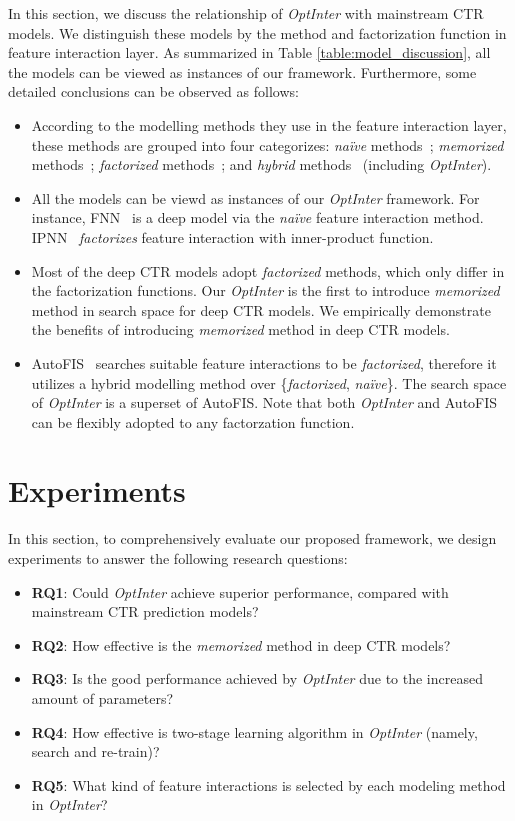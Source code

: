 \documentclass[conference]{IEEEtran}
\begin{document}
In this section, we discuss the relationship of \textit{OptInter} with mainstream CTR models. We distinguish these models by the method and factorization function in feature interaction layer. As summarized in Table \ref{table:model_discussion}, all the models can be viewed as instances of our framework. Furthermore, some detailed conclusions can be observed as follows:
\begin{itemize}
    \item According to the modelling methods they use in the feature interaction layer, these methods are grouped into four categorizes: \emph{naïve} methods~\cite{LR,FNN}; \emph{memorized} methods~\cite{Poly-2,Wide_Deep}; \emph{factorized} methods~\cite{FM,FwFM,FM2,PNN16,PNN19,DeepFM}; and \emph{hybrid} methods~\cite{AutoFis} (including \textit{OptInter}).
     \item All the models can be viewd as instances of our \textit{OptInter} framework. For instance, FNN~\cite{FNN} is a deep model via the \emph{naïve} feature interaction method. IPNN~\cite{PNN16} \emph{factorizes} feature interaction with inner-product function.
    \item Most of the deep CTR models adopt \emph{factorized} methods, which only differ in the factorization functions. Our \textit{OptInter} is the first to introduce \emph{memorized} method in search space for deep CTR models. We empirically demonstrate the benefits of introducing \emph{memorized} method in deep CTR models.
    \item AutoFIS~\cite{AutoFis} searches suitable feature interactions to be \emph{factorized}, therefore it utilizes a hybrid modelling method over \{\emph{factorized}, \emph{naïve}\}. 
    The search space of \textit{OptInter} is a superset of AutoFIS. Note that both \textit{OptInter} and AutoFIS can be flexibly adopted to any factorzation function.
\end{itemize}


 \section{Experiments}

In this section, to comprehensively evaluate our proposed framework, we design experiments to answer the following research questions: 

\begin{itemize}
    \item \textbf{RQ1}: Could \textit{OptInter} achieve superior performance, compared with mainstream CTR prediction models?
    \item \textbf{RQ2}: How effective is the \emph{memorized} method in deep CTR models?
    \item \textbf{RQ3}: Is the good performance achieved by \textit{OptInter} due to the increased amount of parameters?
    \item \textbf{RQ4}: How effective is two-stage learning algorithm in \textit{OptInter} (namely, search and re-train)?
    \item \textbf{RQ5}: What kind of feature interactions is selected by each modeling method in \textit{OptInter}?
\end{itemize}
\end{document}
